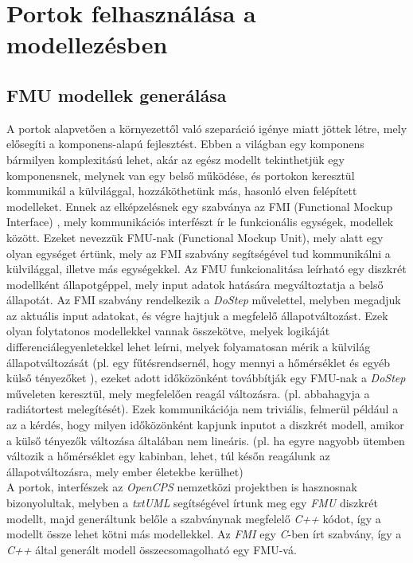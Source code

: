 \documentclass[a4paper,12pt]{report}
\begin{document}
\chapter{Portok felhasználása a modellezésben}

\section{FMU modellek generálása}
A portok alapvetően a környezettől való szeparáció igénye miatt jöttek létre, mely elősegíti a komponens-alapú fejlesztést. Ebben a világban egy komponens bármilyen komplexitású lehet, akár az egész modellt tekinthetjük egy komponensnek, melynek van egy belső működése, és portokon keresztül kommunikál a külvilággal, hozzáköthetünk más, hasonló elven felépített modelleket. Ennek az elképzelésnek egy szabványa az FMI (Functional Mockup Interface) \cite{fmi_standard}, mely kommunikációs interfészt ír le funkcionális egységek, modellek között. Ezeket nevezzük FMU-nak (Functional Mockup Unit), mely alatt egy olyan egységet értünk, mely az FMI  szabvány segítségével tud kommunikálni a külvilággal, illetve más egységekkel. Az FMU funkcionalitása leírható egy diszkrét modellként állapotgéppel, mely input adatok hatására megváltoztatja a belső állapotát. Az FMI szabvány rendelkezik a \textit{DoStep} művelettel, melyben megadjuk az aktuális input adatokat, és végre hajtjuk a megfelelő állapotváltozást. Ezek olyan folytatonos modellekkel vannak összekötve, melyek logikáját differenciálegyenletekkel lehet leírni, melyek folyamatosan mérik a külvilág állapotváltozását (pl. egy fűtésrendsernél, hogy mennyi a hőmérséklet és egyéb külső tényezőket ), ezeket adott időközönként továbbítják egy FMU-nak a \textit{DoStep} műveleten keresztül, mely megfelelően reagál változásra. (pl. abbahagyja a radiátortest melegítését). Ezek kommunikációja nem triviális, felmerül például a az a kérdés, hogy milyen időközönként kapjunk inputot a diszkrét modell, amikor a külső tényezők változása általában nem lineáris. (pl. ha egyre nagyobb ütemben változik a hőmérséklet egy kabinban, lehet, túl későn reagálunk az állapotváltozásra, mely ember életekbe kerülhet) \\ A portok, interfészek az \textit{OpenCPS}\cite{opencps} nemzetközi projektben is hasznosnak bizonyolultak, melyben a \textit{txtUML} segítségével írtunk meg egy \textit{FMU} diszkrét modellt, majd generáltunk belőle a szabványnak megfelelő \textit{C++} kódot, így a modellt össze lehet kötni más modellekkel. Az \textit{FMI} egy \textit{C}-ben írt szabvány, így a \textit{C++} által generált modell összecsomagolható egy FMU-vá. \cite{fmu_export} \\
\end{document}
